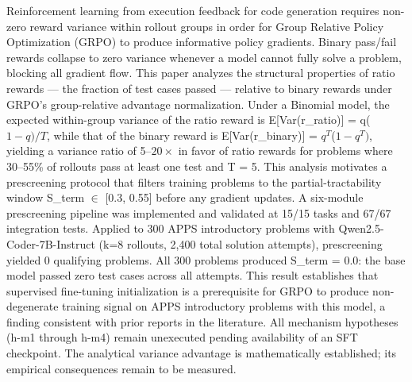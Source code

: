 
Reinforcement learning from execution feedback for code generation requires non-zero reward variance within rollout groups in order for Group Relative Policy Optimization (GRPO) to produce informative policy gradients. Binary pass/fail rewards collapse to zero variance whenever a model cannot fully solve a problem, blocking all gradient flow. This paper analyzes the structural properties of ratio rewards --- the fraction of test cases passed --- relative to binary rewards under GRPO's group-relative advantage normalization. Under a Binomial model, the expected within-group variance of the ratio reward is E[Var(r\_ratio)] = q($1-q)/T$, while that of the binary reward is E[Var(r\_binary)] = $q^T$($1-q^{T})$, yielding a variance ratio of 5--$20\times$ in favor of ratio rewards for problems where 30--55\% of rollouts pass at least one test and T = 5. This analysis motivates a prescreening protocol that filters training problems to the partial-tractability window S\_term $\in$ [0.3, 0.55] before any gradient updates. A six-module prescreening pipeline was implemented and validated at 15/15 tasks and 67/67 integration tests. Applied to 300 APPS introductory problems with Qwen2.5-Coder-7B-Instruct (k=8 rollouts, 2,400 total solution attempts), prescreening yielded 0 qualifying problems. All 300 problems produced S\_term = 0.0: the base model passed zero test cases across all attempts. This result establishes that supervised fine-tuning initialization is a prerequisite for GRPO to produce non-degenerate training signal on APPS introductory problems with this model, a finding consistent with prior reports in the literature. All mechanism hypotheses (h-m1 through h-m4) remain unexecuted pending availability of an SFT checkpoint. The analytical variance advantage is mathematically established; its empirical consequences remain to be measured.

